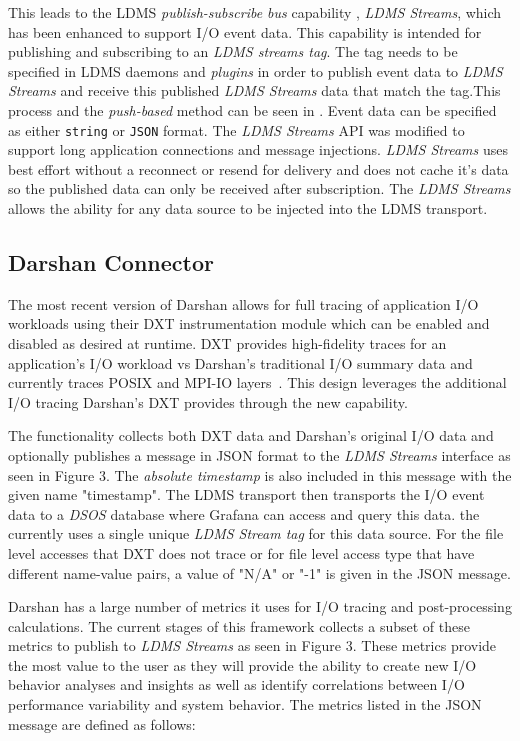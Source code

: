 This leads to the LDMS \emph{publish-subscribe bus} capability , \emph{LDMS Streams}, which has been enhanced to support I/O event data. This capability is intended for publishing and subscribing to an \emph{LDMS streams tag}. The tag needs to be specified in LDMS daemons and \emph{plugins} in order to publish event data to \emph{LDMS Streams} and receive this published \emph{LDMS Streams} data that match the tag.This process and the \emph{push-based} method can be seen in . Event data can be specified as either \texttt{string} or \texttt{JSON} format. The \emph{LDMS Streams} API was modified to support long application connections and message injections. \emph{LDMS Streams} uses best effort without a reconnect or resend for delivery and does not cache it's data so the published data can only be received after subscription. The \emph{LDMS Streams} allows the ability for any data source to be injected into the LDMS transport.

\subsection{Darshan Connector}

The most recent version of Darshan allows for full tracing of application I/O workloads using their DXT instrumentation module which can be enabled and disabled as desired at runtime. DXT provides high-fidelity traces for an application's I/O workload vs Darshan's traditional I/O summary data and currently traces POSIX and MPI-IO layers~\cite{darshan-runtime}. This design leverages the additional I/O tracing Darshan's DXT provides through the new \connector capability.


The \connector functionality collects both DXT data and Darshan's original I/O data and optionally publishes a message in JSON format to the \emph{LDMS Streams} interface as seen in Figure 3. The \emph{absolute timestamp} is also included in this message with the given name "timestamp". The LDMS transport then transports the I/O event data to a \emph{DSOS} database where Grafana can access and query this data. the \connector currently uses a single unique \emph{LDMS Stream tag} for this data source. For the file level accesses that DXT does not trace or for file level access type that have different name-value pairs, a value of "N/A" or "-1" is given in the JSON message. 

Darshan has a large number of metrics it uses for I/O tracing and post-processing calculations. The current stages of this framework collects a subset of these metrics to publish to \emph{LDMS Streams} as seen in Figure 3. These metrics provide the most value to the user as they will provide the ability to create new I/O behavior analyses and insights as well as identify correlations between I/O performance variability and system behavior. The metrics listed in the JSON message are defined as follows: 

